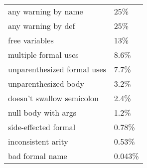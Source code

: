 \begin{tabular}{|l|l|} \hline
any warning by name & 25\% \\ 
any warning by def & 25\% \\ 
free variables & 13\% \\ 
multiple formal uses & 8.6\% \\ 
unparenthesized formal uses & 7.7\% \\ 
unparenthesized body & 3.2\% \\ 
doesn't swallow semicolon & 2.4\% \\ 
null body with args & 1.2\% \\ 
side-effected formal & 0.78\% \\ 
inconsistent arity & 0.53\% \\ 
bad formal name & 0.043\% \\ 
\hline
\end{tabular}
